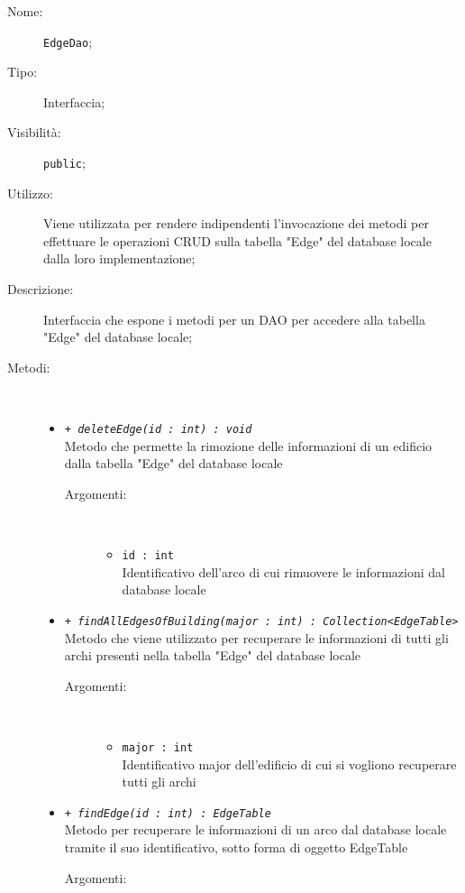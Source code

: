 \documentclass[../DefinizioneDiProdotto.tex]{subfiles}
\begin{document}
    \begin{description}
\item[Nome:] \texttt{EdgeDao};
\item[Tipo:] Interfaccia;
\item[Visibilità:] \texttt{public};
\item[Utilizzo:] Viene utilizzata per rendere indipendenti l'invocazione dei metodi per effettuare le operazioni CRUD sulla tabella "Edge" del database locale dalla loro implementazione;
\item[Descrizione:] Interfaccia che espone i metodi per un DAO per accedere alla tabella "Edge" del database locale;
\item[Metodi:] \
\begin{itemize}
\item \texttt{+ \textit{deleteEdge(id : int) : void}}\\
Metodo che permette la rimozione delle informazioni di un edificio dalla tabella "Edge" del database locale 
 \begin{description}
\item[Argomenti:] \
\begin{itemize}
\item \texttt{id : int}\\
Identificativo dell'arco di cui rimuovere le informazioni dal database locale\end{itemize}
\end{description}
\item \texttt{+ \textit{findAllEdgesOfBuilding(major : int) : Collection<EdgeTable>}}\\
Metodo che viene utilizzato per recuperare le informazioni di tutti gli archi presenti nella tabella "Edge" del database locale
 \begin{description}
\item[Argomenti:] \
\begin{itemize}
\item \texttt{major : int}\\
Identificativo major dell'edificio di cui si vogliono recuperare tutti gli archi\end{itemize}
\end{description}
\item \texttt{+ \textit{findEdge(id : int) : EdgeTable}}\\
Metodo per recuperare le informazioni di un arco dal database locale tramite il suo identificativo, sotto forma di oggetto EdgeTable
 \begin{description}
\item[Argomenti:] \

\end{description}
\end{itemize}
\end{description}
\end{document}
